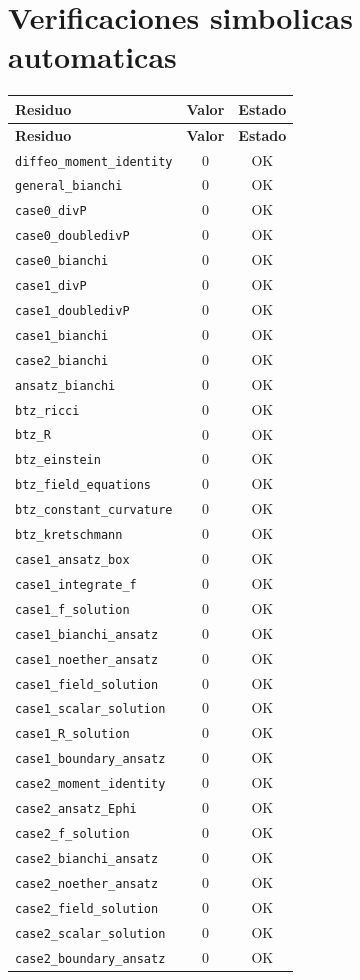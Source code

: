 \documentclass[11pt,a4paper]{article}
\begin{document}
\section{Verificaciones simbolicas automaticas}
\begin{longtable}{p{}cc}
\toprule
\textbf{Residuo} & \textbf{Valor} & \textbf{Estado}\\
\midrule
\endfirsthead
\toprule
\textbf{Residuo} & \textbf{Valor} & \textbf{Estado}\\
\midrule
\endhead
\texttt{diffeo\_moment\_identity} & $0$ & OK\\
\texttt{general\_bianchi} & $0$ & OK\\
\texttt{case0\_divP} & $0$ & OK\\
\texttt{case0\_doubledivP} & $0$ & OK\\
\texttt{case0\_bianchi} & $0$ & OK\\
\texttt{case1\_divP} & $0$ & OK\\
\texttt{case1\_doubledivP} & $0$ & OK\\
\texttt{case1\_bianchi} & $0$ & OK\\
\texttt{case2\_bianchi} & $0$ & OK\\
\texttt{ansatz\_bianchi} & $0$ & OK\\
\texttt{btz\_ricci} & $0$ & OK\\
\texttt{btz\_R} & $0$ & OK\\
\texttt{btz\_einstein} & $0$ & OK\\
\texttt{btz\_field\_equations} & $0$ & OK\\
\texttt{btz\_constant\_curvature} & $0$ & OK\\
\texttt{btz\_kretschmann} & $0$ & OK\\
\texttt{case1\_ansatz\_box} & $0$ & OK\\
\texttt{case1\_integrate\_f} & $0$ & OK\\
\texttt{case1\_f\_solution} & $0$ & OK\\
\texttt{case1\_bianchi\_ansatz} & $0$ & OK\\
\texttt{case1\_noether\_ansatz} & $0$ & OK\\
\texttt{case1\_field\_solution} & $0$ & OK\\
\texttt{case1\_scalar\_solution} & $0$ & OK\\
\texttt{case1\_R\_solution} & $0$ & OK\\
\texttt{case1\_boundary\_ansatz} & $0$ & OK\\
\texttt{case2\_moment\_identity} & $0$ & OK\\
\texttt{case2\_ansatz\_Ephi} & $0$ & OK\\
\texttt{case2\_f\_solution} & $0$ & OK\\
\texttt{case2\_bianchi\_ansatz} & $0$ & OK\\
\texttt{case2\_noether\_ansatz} & $0$ & OK\\
\texttt{case2\_field\_solution} & $0$ & OK\\
\texttt{case2\_scalar\_solution} & $0$ & OK\\
\texttt{case2\_boundary\_ansatz} & $0$ & OK\\
\bottomrule
\end{longtable}
\end{document}
